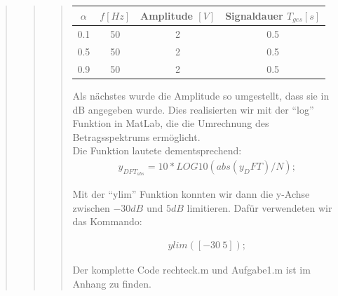 \begin{quote}
\begin{quote}
\begin{quote}
\begin{center}
\begin{tabular}{|c|c|c|c|}
                          \hline
                           $\alpha $ & $f[Hz]$ & Amplitude $[V]$ & Signaldauer
                           $T_{ges}[s]$\\ \hline
                           0.1 & 50 & 2 & 0.5 \\ \hline
                           0.5 & 50 & 2 & 0.5 \\ \hline
                           0.9 & 50 & 2 & 0.5 \\ \hline           
           
                         \end{tabular}
                     \end{center}
                  \vspace{1em}
                
                Als nächstes wurde die Amplitude so umgestellt, dass sie in dB angegeben
                wurde. Dies realisierten wir mit der ``log'' Funktion in MatLab, die die
                Umrechnung des Betragsspektrums ermöglicht.\\
                Die Funktion lautete dementsprechend:\\
                
                \begin{equation*}
                    \begin{split}
                        y_{DFT}_{abs} = 10*LOG10(abs(y_DFT)/N);     
                    \end{split}
                \end{equation*}
        
                Mit der ``ylim'' Funktion konnten wir dann die y-Achse zwischen $-30 dB$
                und $5 dB$ limitieren. Dafür verwendeten wir das Kommando:\\
                
                \begin{center}
                
                \begin{align*}
                    ylim ([-30 \ 5]);
                \end{align*}
                
                \end{center}
                
                Der komplette Code rechteck.m und Aufgabe1.m ist im Anhang zu finden.\\
                

\end{quote}
\end{quote}
\end{quote}
